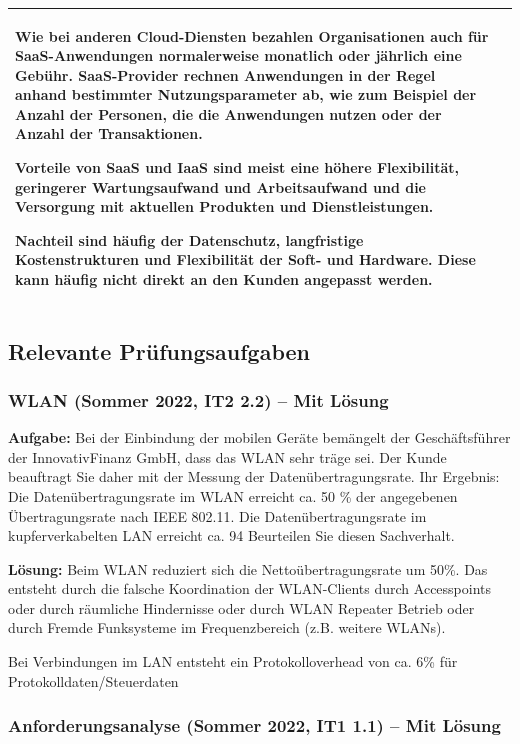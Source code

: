 \documentclass[10pt]{article}
\begin{document}
\begin{flushleft}
\begin{longtable}{|p{}|p{}|}
        Wie bei anderen Cloud-Diensten bezahlen Organisationen auch für SaaS-Anwendungen normalerweise monatlich oder jährlich eine Gebühr. SaaS-Provider rechnen Anwendungen in der Regel anhand bestimmter Nutzungsparameter ab, wie zum Beispiel der Anzahl der Personen, die die Anwendungen nutzen oder der Anzahl der Transaktionen.
        
        Vorteile von SaaS und IaaS sind meist eine höhere Flexibilität, geringerer Wartungsaufwand und Arbeitsaufwand und die Versorgung mit aktuellen Produkten und Dienstleistungen.
        
        Nachteil sind häufig der Datenschutz, langfristige Kostenstrukturen und Flexibilität der Soft- und Hardware. Diese kann häufig nicht direkt an den Kunden angepasst werden.
        
        
        \\\hline
\end{longtable}

\break

\subsection{Relevante Prüfungsaufgaben}

\subsubsection{WLAN (Sommer 2022, IT2 2.2) – Mit Lösung}

\textbf{Aufgabe:}
Bei der Einbindung der mobilen Geräte bemängelt der Geschäftsführer der InnovativFinanz GmbH, dass das WLAN sehr träge sei. Der Kunde beauftragt Sie daher mit der Messung der Datenübertragungsrate.
Ihr Ergebnis:
Die Datenübertragungsrate im WLAN erreicht ca. 50 \% der angegebenen Übertragungsrate nach IEEE 802.11.
Die Datenübertragungsrate im kupferverkabelten LAN erreicht ca. 94 %
Beurteilen Sie diesen Sachverhalt.

\textbf{Lösung:}
Beim WLAN reduziert sich die Nettoübertragungsrate um 50\%. Das entsteht durch die falsche Koordination der WLAN-Clients durch Accesspoints oder durch räumliche Hindernisse oder durch WLAN Repeater Betrieb oder durch Fremde Funksysteme im Frequenzbereich (z.B. weitere WLANs).
 
Bei Verbindungen im LAN entsteht ein Protokolloverhead von ca. 6\% für Protokolldaten/Steuerdaten


\subsubsection{Anforderungsanalyse (Sommer 2022, IT1 1.1) – Mit Lösung}


\end{flushleft}
\end{document}
